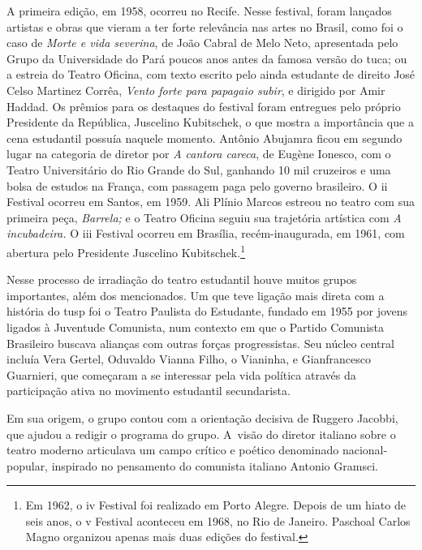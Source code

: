 A primeira edição, em 1958, ocorreu no Recife. Nesse festival, foram
lançados artistas e obras que vieram a ter forte relevância nas artes no
Brasil, como foi o caso de {\it Morte e vida severina}, de João Cabral
de Melo Neto, apresentada pelo Grupo da Universidade do Pará poucos anos
antes da famosa versão do {\sc tuca}; ou a estreia do Teatro Oficina, com
texto escrito pelo ainda estudante de direito José Celso Martinez
Corrêa, {\it Vento forte para papagaio subir}, e dirigido por Amir
Haddad. Os prêmios para os destaques do festival foram entregues pelo
próprio Presidente da República, Juscelino Kubitschek, o que mostra a
importância que a cena estudantil possuía naquele momento. Antônio
Abujamra ficou em segundo lugar na categoria de diretor por {\it A
cantora careca}, de Eugène Ionesco, com o Teatro Universitário do Rio
Grande do Sul, ganhando 10 mil cruzeiros e uma bolsa de estudos na
França, com passagem paga pelo governo brasileiro. O {\sc ii} Festival ocorreu
em Santos, em 1959. Ali Plínio Marcos estreou no teatro com sua primeira
peça, {\it Barrela;} e o Teatro Oficina seguiu sua trajetória artística
com {\it A incubadeira.} O {\sc iii} Festival ocorreu em Brasília,
recém-inaugurada, em 1961, com abertura pelo Presidente Juscelino
Kubitschek.\footnote{Em 1962, o {\sc iv} Festival foi realizado em Porto
  Alegre. Depois de um hiato de seis anos, o {\sc v} Festival aconteceu em
  1968, no Rio de Janeiro. Paschoal Carlos Magno organizou apenas mais
  duas edições do festival.}

\subject{Estudantes e a ideia de nacional-popular: Teatro Paulista do
Estudante}

Nesse processo de irradiação do teatro estudantil houve muitos grupos
importantes, além dos mencionados. Um que teve ligação mais direta com a
história do {\sc tusp} foi o Teatro Paulista do Estudante, fundado em 1955 por
jovens ligados à Juventude Comunista, num contexto em que o Partido
Comunista Brasileiro buscava alianças com outras forças progressistas.
Seu núcleo central incluía Vera Gertel, Oduvaldo Vianna Filho, o
Vianinha, e Gianfrancesco Guarnieri, que começaram a se interessar pela
vida política através da participação ativa no movimento estudantil
secundarista.

Em sua origem, o grupo contou com a orientação decisiva de Ruggero
Jacobbi, que ajudou a redigir o programa do grupo. A~visão do diretor
italiano sobre o teatro moderno articulava um campo crítico e poético
denominado nacional-popular, inspirado no pensamento do comunista
italiano Antonio Gramsci.

